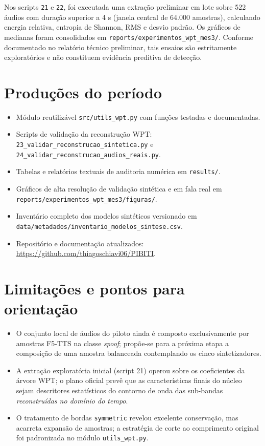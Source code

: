 \documentclass[11pt,a4paper]{article}
\newcommand{\subtitulo}[1]{\vspace{4pt}{\large\bfseries #1}\par\vspace{2pt}}
\begin{document}
\subtitulo{2.4 Ensaios exploratórios de extração de características}
Nos scripts \texttt{21} e \texttt{22}, foi executada uma extração preliminar em lote sobre 522 áudios com duração superior a 4 s (janela central de 64.000 amostras), calculando energia relativa, entropia de Shannon, RMS e desvio padrão. Os gráficos de medianas foram consolidados em \texttt{reports/experimentos\_wpt\_mes3/}. Conforme documentado no relatório técnico preliminar, tais ensaios são estritamente exploratórios e não constituem evidência preditiva de detecção.

\section{Produções do período}
\begin{itemize}
\item Módulo reutilizável \texttt{src/utils\_wpt.py} com funções testadas e documentadas.
\item Scripts de validação da reconstrução WPT: \texttt{23\_validar\_reconstrucao\_sintetica.py} e \texttt{24\_validar\_reconstrucao\_audios\_reais.py}.
\item Tabelas e relatórios textuais de auditoria numérica em \texttt{results/}.
\item Gráficos de alta resolução de validação sintética e em fala real em \texttt{reports/experimentos\_wpt\_mes3/figuras/}.
\item Inventário completo dos modelos sintéticos versionado em \texttt{data/metadados/inventario\_modelos\_sintese.csv}.
\item Repositório e documentação atualizados: \url{https://github.com/thiagoschiavi06/PIBITI}.
\end{itemize}

\section{Limitações e pontos para orientação}
\begin{itemize}
\item O conjunto local de áudios do piloto ainda é composto exclusivamente por amostras F5-TTS na classe \emph{spoof}; propõe-se para a próxima etapa a composição de uma amostra balanceada contemplando os cinco sintetizadores.
\item A extração exploratória inicial (script 21) operou sobre os coeficientes da árvore WPT; o plano oficial prevê que as características finais do núcleo sejam descritores estatísticos do contorno de onda das sub-bandas \emph{reconstruídas no domínio do tempo}.
\item O tratamento de bordas \texttt{symmetric} revelou excelente conservação, mas acarreta expansão de amostras; a estratégia de corte ao comprimento original foi padronizada no módulo \texttt{utils\_wpt.py}.
\end{itemize}
\end{document}
